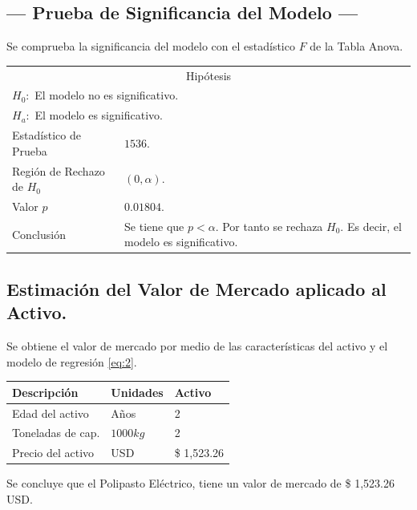 \subsection{\centering --- Prueba de Significancia del Modelo ---} %
Se comprueba la significancia del modelo con el estadístico \(F\) de la Tabla Anova.
\begin{center}
  \begin{tabular}{|l|p{6cm}|}
    \cline{1-2}
    \multicolumn{2}{|c|}{Hipótesis}\\ \cline{1-2}
    \multicolumn{2}{|l|}{\(H_0:\) El modelo no es significativo.} \\ 
    \multicolumn{2}{|l|}{\(H_a:\) El modelo es significativo.} \\ \cline{1-2}
    Estadístico de Prueba & \(1536\).\\ \cline{1-2} 
		Región de Rechazo de \(H_0\) & \((0, \alpha )\).\\ \cline{1-2} 
    Valor \(p\) & \(0.01804\).\\ \cline{1-2} 
    Conclusión & Se tiene que \(p<\alpha\). \newline 
		Por tanto se rechaza \(H_0\). \newline 
		Es decir, el modelo es significativo.\\ \cline{1-2} 
  \end{tabular}
\end{center} 

\subsection{\centering Estimación del Valor de Mercado aplicado al Activo.} %
Se obtiene el valor de mercado por medio de las características del activo y el modelo de regresión \eqref{eq:2}.
\begin{center}
  \begin{tabular}{|l|l|l|}
    \hline 
		Descripción   & Unidades  & Activo \\ \hline 
    Edad del activo    & Años      & 2      \\ \hline 
		Toneladas de cap.  & \(1000kg\) & 2   \\ \hline 
		Precio del activo   & USD       & \$ 1,523.26   \\ \hline 
  \end{tabular}
\end{center} 
Se concluye que el Polipasto Eléctrico, tiene un valor de mercado de 
\$ 1,523.26  USD.

